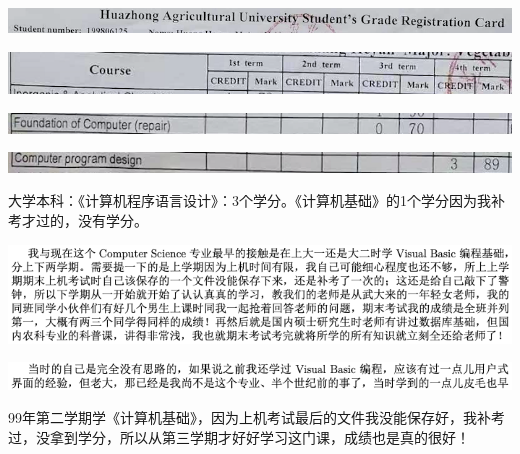 \documentclass[9pt, b5paper]{article}
\begin{document}
\begin{center}
\includegraphics[width=.9\linewidth]{./pic/backups_plans_20210419_095006.png}
\end{center}

\begin{center}
\includegraphics[width=.9\linewidth]{./pic/backups_plans_20210419_093849.png}
\end{center}

\begin{center}
\includegraphics[width=.9\linewidth]{./pic/backups_plans_20210419_093428.png}
\end{center}

\begin{center}
\includegraphics[width=.9\linewidth]{./pic/backups_plans_20210419_093456.png}
\end{center}

大学本科：《计算机程序语言设计》：3个学分。《计算机基础》的1个学分因为我补考才过的，没有学分。

\begin{center}
\includegraphics[width=.9\linewidth]{./pic/backups_plans_20210421_134744.png}
\end{center}

\begin{center}
\includegraphics[width=.9\linewidth]{./pic/backups_plans_20210421_134614.png}
\end{center}

99年第二学期学《计算机基础》，因为上机考试最后的文件我没能保存好，我补考过，没拿到学分，所以从第三学期才好好学习这门课，成绩也是真的很好！
\end{document}
